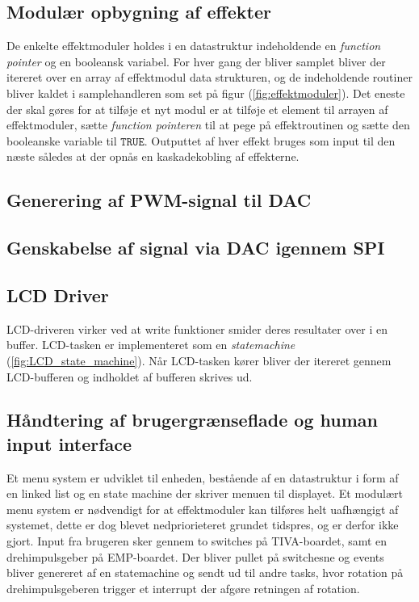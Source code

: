 \subsection{Modulær opbygning af effekter}
De enkelte effektmoduler holdes i en datastruktur indeholdende en \textit{function pointer} og en booleansk variabel.
For hver gang der bliver samplet bliver der itereret over en array af effektmodul data strukturen, og de indeholdende routiner bliver kaldet i samplehandleren som set på figur (\ref{fig:effektmoduler}).\newline
Det eneste der skal gøres for at tilføje et nyt modul er at tilføje et element til arrayen af effektmoduler, sætte \textit{function pointeren} til at pege på effektroutinen og sætte den booleanske variable til $\mathtt{TRUE}$.
Outputtet af hver effekt bruges som input til den næste således at der opnås en kaskadekobling af effekterne.


\subsection{Generering af PWM-signal til DAC}


\subsection{Genskabelse af signal via DAC igennem SPI}


\subsection{LCD Driver}
LCD-driveren virker ved at write funktioner smider deres resultater over i en buffer.
LCD-tasken er implementeret som en \textit{statemachine} (\ref{fig:LCD_state_machine}).
Når LCD-tasken kører bliver der itereret gennem LCD-bufferen og indholdet af bufferen skrives ud.


\subsection{Håndtering af brugergrænseflade og human input interface}

Et menu system er udviklet til enheden, bestående af en datastruktur i form af en linked list og en state machine der skriver menuen til displayet.
Et modulært menu system er nødvendigt for at effektmoduler kan tilføres helt uafhængigt af systemet, dette er dog blevet nedpriorieteret grundet tidspres, og er derfor ikke gjort.
Input fra brugeren sker gennem to switches på TIVA-boardet, samt en drehimpulsgeber på EMP-boardet.
Der bliver pullet på switchesne og events bliver genereret af en statemachine og sendt ud til andre tasks, hvor rotation på drehimpulsgeberen trigger et interrupt der afgøre retningen af rotation.
